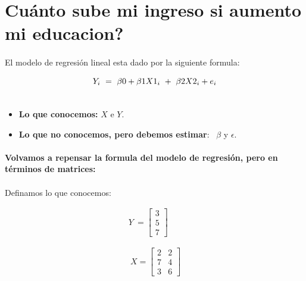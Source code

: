 \documentclass[10pt]{article}
\begin{document}
\section{Cu\'anto sube mi ingreso si aumento mi educacion? }

\paragraph{}El modelo de regresi\'on lineal esta dado por la siguiente formula:


\begin{center}

\begin{gather}
Y_{i} \ =\ \beta 0+\beta 1X1_{i} \ +\ \beta 2X2_{i} +e_{i} \notag\\
 \notag
\end{gather}
\end{center}




\begin{itemize}
\item \textbf{Lo que conocemos:} $\displaystyle X$ e $\displaystyle Y$. 
\item \textbf{Lo que no conocemos, pero debemos estimar}: \ $\displaystyle \beta $ y $\displaystyle \epsilon $.
\end{itemize}



\paragraph{}{\Large \textbf{Volvamos a repensar la formula del modelo de regresi\'on, pero en t\'erminos de matrices:}}



\paragraph{}Definamos lo que conocemos:


\begin{gather*}
Y\ =\begin{bmatrix}
3\\
5\\
7
\end{bmatrix}\\
\\
\\
\ X=\begin{bmatrix}
2 & 2\\
7 & 4\\
3 & 6
\end{bmatrix}
\end{gather*}
\begin{equation*}
\end{equation*}
\end{document}
